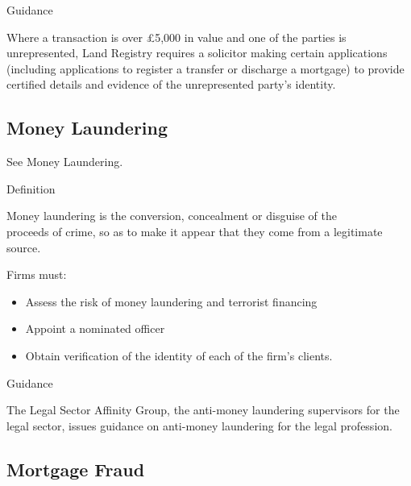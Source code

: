 \documentclass[
]{article}
\providecommand{\tightlist}{%
  \setlength{\itemsep}{0pt}\setlength{\parskip}{0pt}}
\newenvironment{env-615494ee-4c11-425d-a24a-676608cc22a4}
{
    \savenotes\tcolorbox[blanker,breakable,left=5pt,borderline west={2pt}{-4pt}{gold}]
}
{
    \endtcolorbox\spewnotes
}
\newenvironment{env-785438bb-4d67-4370-80ef-9aa959fc6b60}
{
    \savenotes\tcolorbox[blanker,breakable,left=5pt,borderline west={2pt}{-4pt}{darkred}]
}
{
    \endtcolorbox\spewnotes
}
\begin{document}
\begin{env-785438bb-4d67-4370-80ef-9aa959fc6b60}

Guidance

Where a transaction is over £5,000 in value and one of the parties is
unrepresented, Land Registry requires a solicitor making certain
applications (including applications to register a transfer or discharge
a mortgage) to provide certified details and evidence of the
unrepresented party's identity.

\end{env-785438bb-4d67-4370-80ef-9aa959fc6b60}

\hypertarget{money-laundering}{%
\subsection{Money Laundering}\label{money-laundering}}

See Money Laundering.

\begin{env-615494ee-4c11-425d-a24a-676608cc22a4}

Definition

Money laundering is the conversion, concealment or disguise of the\\
proceeds of crime, so as to make it appear that they come from a
legitimate source.

\end{env-615494ee-4c11-425d-a24a-676608cc22a4}

Firms must:

\begin{itemize}
\tightlist
\item
  Assess the risk of money laundering and terrorist financing
\item
  Appoint a nominated officer
\item
  Obtain verification of the identity of each of the firm's clients.
\end{itemize}

\begin{env-785438bb-4d67-4370-80ef-9aa959fc6b60}

Guidance

The Legal Sector Affinity Group, the anti-money laundering supervisors
for the legal sector, issues guidance on anti-money laundering for the
legal profession.

\end{env-785438bb-4d67-4370-80ef-9aa959fc6b60}

\hypertarget{mortgage-fraud}{%
\subsection{Mortgage Fraud}\label{mortgage-fraud}}
\end{document}
